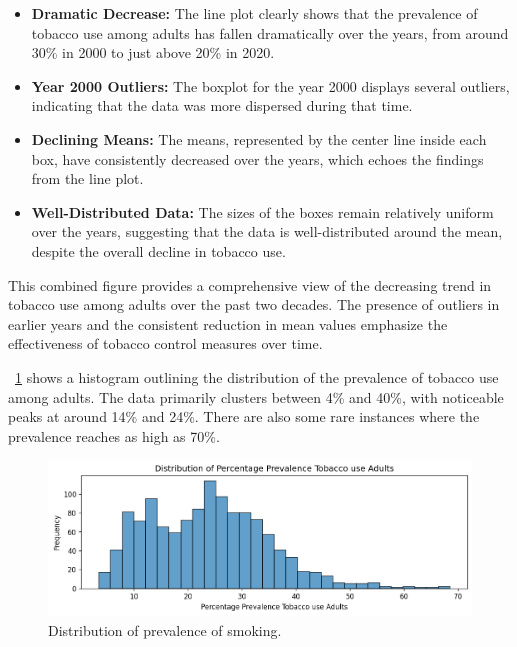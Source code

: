             \begin{itemize}
                \item \textbf{Dramatic Decrease:} The line plot clearly shows that the prevalence of tobacco use among adults has fallen dramatically over the years, from around 30\% in 2000 to just above 20\% in 2020.

                \item \textbf{Year 2000 Outliers:} The boxplot for the year 2000 displays several outliers, indicating that the data was more dispersed during that time.

                \item \textbf{Declining Means:} The means, represented by the center line inside each box, have consistently decreased over the years, which echoes the findings from the line plot.

                \item \textbf{Well-Distributed Data:} The sizes of the boxes remain relatively uniform over the years, suggesting that the data is well-distributed around the mean, despite the overall decline in tobacco use.
            \end{itemize}

            This combined figure provides a comprehensive view of the decreasing trend in tobacco use among adults over the past two decades. The presence of outliers in earlier years and the consistent reduction in mean values emphasize the effectiveness of tobacco control measures over time.


            \figurename~\ref{fig:du-smoking-distribution} shows a histogram outlining the distribution of the prevalence of tobacco use among adults. The data primarily clusters between 4\% and 40\%, with noticeable peaks at around 14\% and 24\%. There are also some rare instances where the prevalence reaches as high as 70\%.

            \begin{figure}[H]
                \centering
                \includegraphics[scale=0.8]{images/du_smoking_pr_sm_freq}
                \caption{Distribution of prevalence of smoking.}
                \label{fig:du-smoking-distribution}
            \end{figure}

